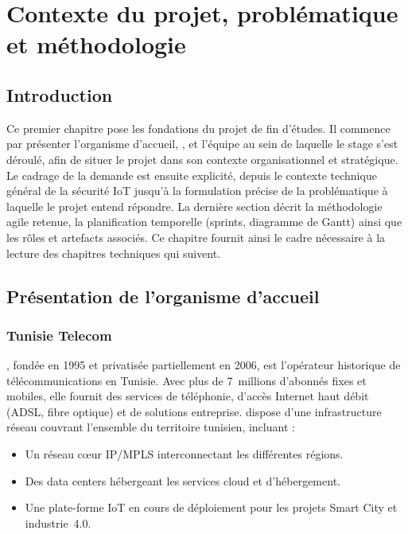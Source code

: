 \chapter{Contexte du projet, problématique et méthodologie}

\section{Introduction}

Ce premier chapitre pose les fondations du projet de fin d'études. Il commence par présenter l'organisme d'accueil, \TT{}, et l'équipe au sein de laquelle le stage s'est déroulé, afin de situer le projet dans son contexte organisationnel et stratégique. Le cadrage de la demande est ensuite explicité, depuis le contexte technique général de la sécurité IoT jusqu'à la formulation précise de la problématique à laquelle le projet entend répondre. La dernière section décrit la méthodologie agile retenue, la planification temporelle (sprints, diagramme de Gantt) ainsi que les rôles et artefacts associés. Ce chapitre fournit ainsi le cadre nécessaire à la lecture des chapitres techniques qui suivent.

\section{Présentation de l'organisme d'accueil}

\subsection{Tunisie Telecom}

\TT{}, fondée en 1995 et privatisée partiellement en 2006, est l'opérateur historique de télécommunications en Tunisie. Avec plus de 7~millions d'abonnés fixes et mobiles, elle fournit des services de téléphonie, d'accès Internet haut débit (ADSL, fibre optique) et de solutions entreprise. \TT{} dispose d'une infrastructure réseau couvrant l'ensemble du territoire tunisien, incluant :

\begin{itemize}
  \item Un réseau cœur IP/MPLS interconnectant les différentes régions.
  \item Des data centers hébergeant les services cloud et d'hébergement.
  \item Une plate-forme IoT en cours de déploiement pour les projets Smart City et industrie~4.0.
\end{itemize}

